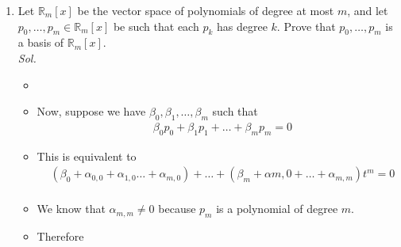 \documentclass[11pt]{article}
\newcommand{\R}{\mathbb{R}}
\begin{document}
\begin{enumerate}
\begin{itemize}
  \end{itemize}

	
  \clearpage
	\item Let $\R_m[x]$ be the vector space of polynomials of degree at most $m$, and let $p_0,\ldots,p_m \in \R_m[x]$ be such that each $p_k$ has degree $k$. Prove that $p_0,\ldots,p_m$ is a basis of $\R_m[x]$.
    \\ \textit{ Sol. }
    \begin{itemize}
      \item[]
      \begin{center}
\end{center}
\item[] Now, suppose we have $\beta_0, \beta_1, \dots, \beta_m$ such that \begin{align*}
    & \beta_0 p_0 + \beta_1 p_1 + \dots + \beta_m p_m = 0
  \end{align*}
\item[] This is equivalent to \begin{align*}
    & (\beta_0 + \alpha_{0,0} + \alpha_{1,0} \dots + \alpha_{m,0}) + 
    \dots + (\beta_m + \alpha{m, 0} + \dots + \alpha_{m,m})t^m = 0 \\
  \end{align*}
\item[] We know that $\alpha_{m,m} \neq 0$ because $p_m$ is a polynomial of degree $m$. 
\item[] Therefore \begin{align*}

\end{align*}
\end{itemize}
\end{enumerate}
\end{document}
